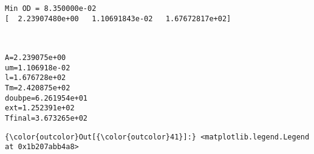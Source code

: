 \documentclass[11pt]{article}
\begin{document}
    \begin{Verbatim}[commandchars=\\\{\}]
Min OD = 8.350000e-02
[  2.23907480e+00   1.10691843e-02   1.67672817e+02]

    \end{Verbatim}

    \begin{center}
    \end{center}
    { \hspace*{\fill} \\}
    
    \begin{Verbatim}[commandchars=\\\{\}]
A=2.239075e+00
um=1.106918e-02
l=1.676728e+02
Tm=2.420875e+02
doubpe=6.261954e+01
ext=1.252391e+02
Tfinal=3.673265e+02

    \end{Verbatim}

            \begin{Verbatim}[commandchars=\\\{\}]
{\color{outcolor}Out[{\color{outcolor}41}]:} <matplotlib.legend.Legend at 0x1b207abb4a8>
\end{Verbatim}
        
    \begin{center}
    \end{center}
    { \hspace*{\fill} \\}
    
    \begin{center}
    \end{center}
    { \hspace*{\fill} \\}
    
\end{document}
